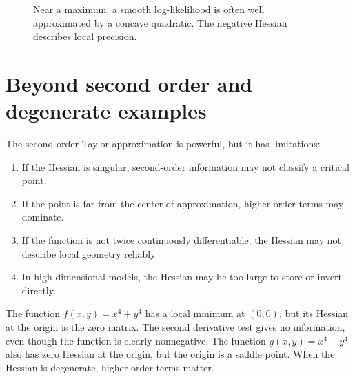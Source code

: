 \documentclass[11pt]{article}
\begin{document}
\begin{figure}[H]
\centering
{}
\caption{Near a maximum, a smooth log-likelihood is often well approximated by a concave quadratic. The negative Hessian describes local precision.}
\end{figure}

\section{Beyond second order and degenerate examples}

The second-order Taylor approximation is powerful, but it has limitations:
\begin{enumerate}
  \item If the Hessian is singular, second-order information may not classify a critical point.
  \item If the point is far from the center of approximation, higher-order terms may dominate.
  \item If the function is not twice continuously differentiable, the Hessian may not describe local geometry reliably.
  \item In high-dimensional models, the Hessian may be too large to store or invert directly.
\end{enumerate}

The function $f(x,y)=x^4+y^4$ has a local minimum at $(0,0)$, but its Hessian at the origin is the zero matrix. The second derivative test gives no information, even though the function is clearly nonnegative. The function $g(x,y)=x^4-y^4$ also has zero Hessian at the origin, but the origin is a saddle point. When the Hessian is degenerate, higher-order terms matter.
\end{document}
